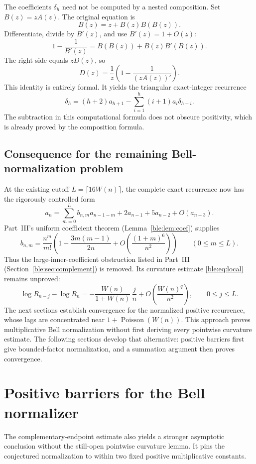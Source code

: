 \documentclass[11pt]{article}
\numberwithin{equation}{section}
\theoremstyle{definition}
\theoremstyle{remark}
\DeclareMathOperator{\Poisson}{Poisson}
\begin{document}
The coefficients \(\delta_h\) need not be computed by a nested composition.
Set \(B(z)=zA(z)\).  The original equation is
\[
 B(z)=z+B(z)B(B(z)).
\]
Differentiate, divide by \(B'(z)\), and use
\(B'(z)=1+O(z)\):
\[
 1-\frac1{B'(z)}
     =B(B(z))+B(z)B'(B(z)).
\]
The right side equals \(zD(z)\), so
\[
 \boxed{D(z)=\frac1z\left(1-\frac1{(zA(z))'}\right).}
\]
This identity is entirely formal.
It yields the triangular exact-integer recurrence
\[
 \delta_h=(h+2)a_{h+1}
        -\sum_{i=1}^{h}(i+1)a_i \delta_{h-i}.
\]
The subtraction in this computational formula does not obscure
positivity, which is already proved by the composition formula.

\subsection{Consequence for the remaining Bell-normalization problem}

At the existing cutoff \(L=\lceil16W(n)\rceil\), the complete exact
recurrence now has the rigorously controlled form
\[
 a_n=
 \sum_{m=0}^{L}b_{n,m}a_{n-1-m}
       +2a_{n-1}+5a_{n-2}+O(a_{n-3}).
\]
Part~III's uniform coefficient theorem (Lemma~\ref{ble:lem:coef}) supplies
\[
 b_{n,m}=\frac{n^m}{m!}
 \left(1+\frac{3m(m-1)}{2n}
       +O\!\left(\frac{(1+m)^6}{n^2}\right)\right)
 \qquad(0\le m\le L).
\]
Thus the large-inner-coefficient obstruction listed in Part~III
(Section~\ref{ble:sec:complement}) is removed.  Its curvature estimate
\eqref{ble:eq:local} remains unproved:
\[
 \log R_{n-j}-\log R_n
 =-\frac{W(n)}{1+W(n)}\,\frac jn
     +O\!\left(\frac{W(n)^q}{n^2}\right),
 \qquad 0\le j\le L.
\]
The next sections establish convergence for the normalized
positive recurrence, whose lags are concentrated near
\(1+\Poisson (W(n))\).  This approach proves multiplicative Bell normalization without first deriving every pointwise curvature estimate.  The following sections develop that
alternative: positive barriers first give bounded-factor normalization,
and a summation argument then proves convergence.


\section{Positive barriers for the Bell normalizer}\label{bnc:sec:bellbarriers}

The complementary-endpoint estimate also yields a stronger asymptotic
conclusion without the still-open pointwise curvature lemma.
It pins the conjectured normalization to within two fixed positive
multiplicative constants.
\end{document}
